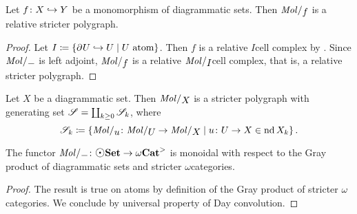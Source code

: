 \begin{lem} \label{lem:molecin_preserves_cofibration}
    Let \( f \colon X \hookrightarrow Y \) be a monomorphism of diagrammatic sets.
    Then \( \molecin{f} \) is a relative stricter polygraph.
\end{lem}
\begin{proof}
    Let \( I \coloneqq \left\{ {\partial_{}^{} U \hookrightarrow U \mid U \text{ atom}} \right\} \).
    Then \( f \) is a relative \( I \)\nbd cell complex by \cite[Remark 2.9]{chanavat2024htpy}.
    Since \( \molecin{-} \) is left adjoint, \( \molecin{f} \) is a relative \( \molecin{I} \)\nbd cell complex, that is, a relative stricter polygraph.
\end{proof}

\begin{cor} \label{cor:molecin_polygraph_with_basis}
    Let \( X \) be a diagrammatic set. 
    Then \( \molecin{X} \) is a stricter polygraph with generating set \( \mathscr{S} = \coprod_{k \geq 0} \mathscr{S}_k \), where
    \begin{equation*}
        \cls{S}_k \eqdef \set{\molecin{u} \colon \molecin{U} \to \molecin{X} \mid u \colon U \to X \in \gr{k}{\nd X}}.
    \end{equation*}
\end{cor}

\begin{lem} \label{lem:molecin_monoidal}
    The functor \( \molecin{-} \colon \dgmSet \to \somegaCat \) is monoidal with respect to the Gray product of diagrammatic sets and stricter \( \omega \)\nbd categories.
\end{lem}
\begin{proof}
    The result is true on atoms by definition of the Gray product of stricter \( \omega \)\nbd categories.
    We conclude by universal property of Day convolution.
\end{proof}

